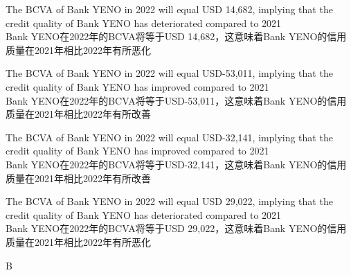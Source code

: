 \documentclass{article}
\begin{document}
\begin{choices}
    \item The BCVA of Bank YENO in 2022 will equal USD 14,682, implying that the credit quality of Bank YENO has deteriorated compared to 2021\\
    Bank YENO在2022年的BCVA将等于USD 14,682，这意味着Bank YENO的信用质量在2021年相比2022年有所恶化
    \item The BCVA of Bank YENO in 2022 will equal USD-53,011, implying that the credit quality of Bank YENO has improved compared to 2021\\
    Bank YENO在2022年的BCVA将等于USD-53,011，这意味着Bank YENO的信用质量在2021年相比2022年有所改善
    \item The BCVA of Bank YENO in 2022 will equal USD-32,141, implying that the credit quality of Bank YENO has improved compared to 2021\\
    Bank YENO在2022年的BCVA将等于USD-32,141，这意味着Bank YENO的信用质量在2021年相比2022年有所改善
    \item The BCVA of Bank YENO in 2022 will equal USD 29,022, implying that the credit quality of Bank YENO has deteriorated compared to 2021\\
    Bank YENO在2022年的BCVA将等于USD 29,022，这意味着Bank YENO的信用质量在2021年相比2022年有所恶化
\end{choices}

\begin{correctanswer}
    B
\end{correctanswer}
\end{document}
